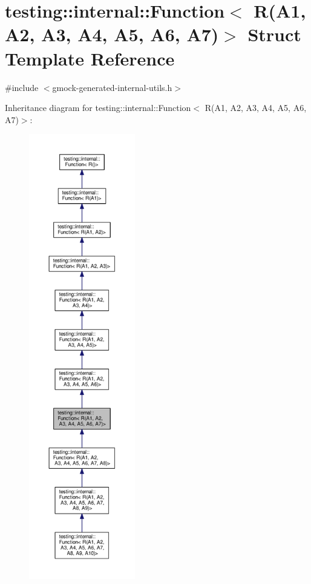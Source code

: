 \hypertarget{structtesting_1_1internal_1_1Function_3_01R_07A1_00_01A2_00_01A3_00_01A4_00_01A5_00_01A6_00_01A7_08_4}{}\section{testing\+:\+:internal\+:\+:Function$<$ R(A1, A2, A3, A4, A5, A6, A7)$>$ Struct Template Reference}
\label{structtesting_1_1internal_1_1Function_3_01R_07A1_00_01A2_00_01A3_00_01A4_00_01A5_00_01A6_00_01A7_08_4}


{\ttfamily \#include $<$gmock-\/generated-\/internal-\/utils.\+h$>$}



Inheritance diagram for testing\+:\+:internal\+:\+:Function$<$ R(A1, A2, A3, A4, A5, A6, A7)$>$\+:
\nopagebreak
\begin{figure}[H]
\begin{center}
\leavevmode
\includegraphics[height=550pt]{structtesting_1_1internal_1_1Function_3_01R_07A1_00_01A2_00_01A3_00_01A4_00_01A5_00_01A6_00_01A7_08_4__inherit__graph}
\end{center}
\end{figure}


